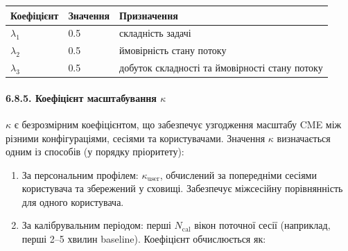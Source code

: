 \documentclass[12pt,a4paper]{article}
\begin{document}
{\def\LTcaptype{none} %

\begin{longtable}[]{@{}lll@{}}

\toprule\noalign{}

Коефіцієнт & Значення & Призначення \\

\midrule\noalign{}

\endhead

\bottomrule\noalign{}

\endlastfoot

\(\lambda_1\) & 0.5 & складність задачі \\

\(\lambda_2\) & 0.5 & ймовірність стану потоку \\

\(\lambda_3\) & 0.5 & добуток складності та ймовірності стану потоку \\

\end{longtable}

}



\paragraph{\texorpdfstring{6.8.5. Коефіцієнт масштабування \(\kappa\)}{6.8.5. Коефіцієнт масштабування \textbackslash kappa}}\label{ux43aux43eux435ux444ux456ux446ux456ux454ux43dux442-ux43cux430ux441ux448ux442ux430ux431ux443ux432ux430ux43dux43dux44f-kappa}



\(\kappa\) є безрозмірним коефіцієнтом, що забезпечує узгодження масштабу CME між різними конфігураціями, сесіями та користувачами. Значення \(\kappa\) визначається одним із способів (у порядку пріоритету):



\begin{enumerate}

\def\labelenumi{\arabic{enumi}.}

\tightlist

\item

  За персональним профілем: \(\kappa_{\text{user}}\), обчислений за попередніми сесіями користувача та збережений у сховищі. Забезпечує міжсесійну порівнянність для одного користувача.

\item

  За калібрувальним періодом: перші \(N_{\text{cal}}\) вікон поточної сесії (наприклад, перші 2--5 хвилин baseline). Коефіцієнт обчислюється як:

\end{enumerate}
\end{document}
